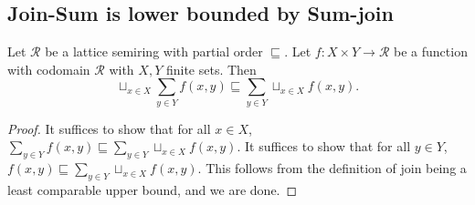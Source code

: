 \subsection{Join-Sum is lower bounded by Sum-join}
\label{appendix:commute join}

\begin{lemma}\label{lemma:commute join}
  Let $\mathcal R$ be a lattice semiring with partial order $\sqsubseteq$.
  Let $f : X \times Y \to \mathcal R$ be a function with codomain 
  $\mathcal R$ with $X, Y$ finite sets. Then
  \begin{equation}
    \sqcup_{x \in X} \sum_{y \in Y} f(x,y) \sqsubseteq 
    \sum_{y \in Y} \sqcup_{x \in X} f(x,y).
  \end{equation}
\end{lemma}

\begin{proof}
  It suffices to show that for all $x \in X$, $\sum_{y \in Y} f(x,y) \sqsubseteq
  \sum_{y \in Y} \sqcup_{x \in X} f(x,y).$ It suffices to show that for all
  $y \in Y$, $f(x,y) \sqsubseteq
  \sum_{y \in Y} \sqcup_{x \in X} f(x,y).$ This follows from the definition
  of join being a least comparable upper bound, and we are done.
\end{proof}
